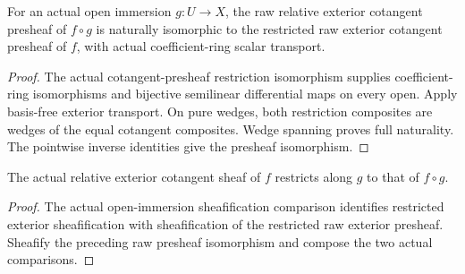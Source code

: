 \begin{theorem}
\label{sc0-canonical-port:can:raw-exterior-cotangent-open-restriction}
\leanok
For an actual open immersion \(g:U\to X\), the raw relative exterior
cotangent presheaf of \(f\circ g\) is naturally isomorphic to the
restricted raw exterior cotangent presheaf of \(f\), with actual
coefficient-ring scalar transport.
\end{theorem}
\begin{proof}
The actual cotangent-presheaf restriction isomorphism supplies
coefficient-ring isomorphisms and bijective semilinear differential
maps on every open. Apply basis-free exterior transport.
On pure wedges, both restriction composites are wedges of the equal
cotangent composites. Wedge spanning proves full naturality.
The pointwise inverse identities give the presheaf isomorphism.
\end{proof}

\begin{theorem}
\label{sc0-canonical-port:can:relative-exterior-cotangent-sheaf-open-restriction}
\leanok
The actual relative exterior cotangent sheaf of \(f\) restricts
along \(g\) to that of \(f\circ g\).
\end{theorem}
\begin{proof}
The actual open-immersion sheafification comparison identifies
restricted exterior sheafification with sheafification of the
restricted raw exterior presheaf. Sheafify the preceding raw
presheaf isomorphism and compose the two actual comparisons.
\end{proof}

